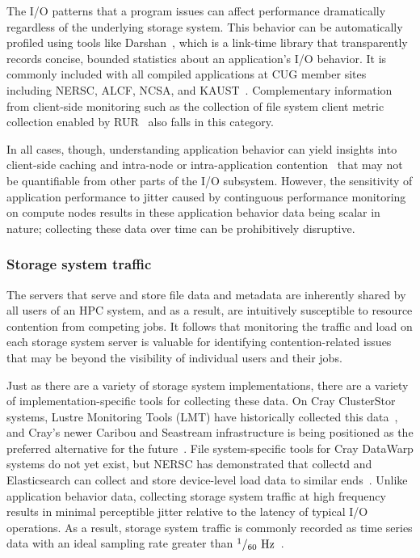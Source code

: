 The I/O patterns that a program issues can affect performance dramatically regardless of the underlying storage system.
This behavior can be automatically profiled using tools like Darshan~\cite{Carns2009}, which is a link-time library that transparently records concise, bounded statistics about an application's I/O behavior.  
It is commonly included with all compiled applications at CUG member sites including NERSC, ALCF, NCSA, and KAUST~\cite{Lockwood2017,Luu:2015:HPDC,Hadri2015,White2017}.
Complementary information from client-side monitoring  such as the collection of file system client metric collection enabled by RUR~\cite{Butler2014} also falls in this category.

In all cases, though, understanding application behavior can yield insights into client-side caching and intra-node or intra-application contention~\cite{Lofstead2010} that may not be quantifiable from other parts of the I/O subsystem.
However, the sensitivity of application performance to jitter caused by continguous performance monitoring on compute nodes results in these application behavior data being scalar in nature; collecting these data over time can be prohibitively disruptive.

\subsubsection{Storage system traffic} \label{sec:architecture/components/fs}

The servers that serve and store file data and metadata are inherently shared by all users of an HPC system, and as a result, are intuitively susceptible to resource contention from competing jobs.
It follows that monitoring the traffic and load on each storage system server is valuable for identifying contention-related issues that may be beyond the visibility of individual users and their jobs.

Just as there are a variety of storage system implementations, there are a variety of implementation-specific tools for collecting these data.
On Cray ClusterStor systems, Lustre Monitoring Tools (LMT) have historically collected this data~\cite{Keopp2014}, and Cray's newer Caribou and Seastream infrastructure is being positioned as the preferred alternative for the future~\cite{Flaskerud2017}.
File system-specific tools for Cray DataWarp systems do not yet exist, but NERSC has demonstrated that collectd and Elasticsearch can collect and store device-level load data to similar ends~\cite{Whitney2016}.
Unlike application behavior data, collecting storage system traffic at high frequency results in minimal perceptible jitter relative to the latency of typical I/O operations.
As a result, storage system traffic is commonly recorded as time series data with an ideal sampling rate greater than ${{^1 / _{60} \textup{ Hz}}}$~\cite{Madireddy2017}.

